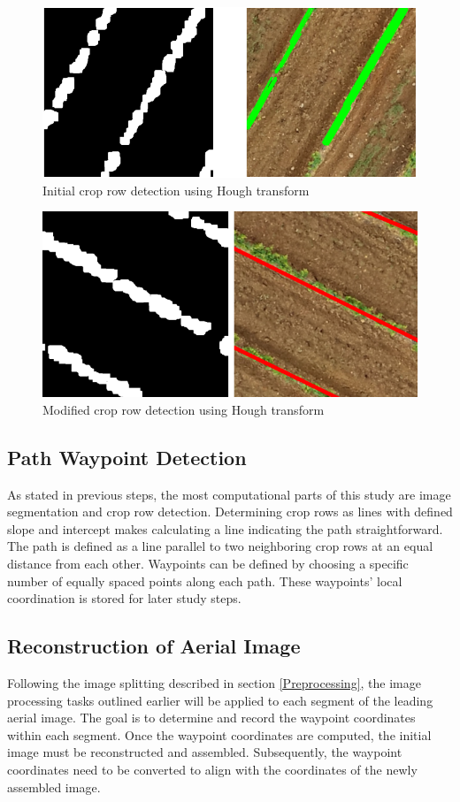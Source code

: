 \documentclass[conference]{IEEEtran}
\begin{document}
\begin{figure}[htbp]
\includegraphics[width=\linewidth]{Hough initial2.png}
\caption{Initial crop row detection using Hough transform
\cite{b5}}
\label{fig3}
\end{figure}

\begin{figure}[htbp]
\includegraphics[width=\linewidth]{Hough Revised2.png}
\caption{Modified crop row detection using Hough transform
\cite{b5}}
\label{fig4}
\end{figure}
\subsection{Path Waypoint Detection}\label{Path Waypoint Detection}
As stated in previous steps, the most computational parts of this study are image segmentation and crop row detection. Determining crop rows as lines with defined slope and intercept makes calculating a line indicating the path straightforward. The path is defined as a line parallel to two neighboring crop rows at an equal distance from each other.
Waypoints can be defined by choosing a specific number of equally spaced points along each path. These waypoints' local coordination is stored for later study steps.

\subsection{Reconstruction of Aerial Image}\label{Reconstruction of Aerial Image}
Following the image splitting described in section 
\ref{Preprocessing}, the image processing tasks outlined earlier will be applied to each segment of the leading aerial image. The goal is to determine and record the waypoint coordinates within each segment. Once the waypoint coordinates are computed, the initial image must be reconstructed and assembled. Subsequently, the waypoint coordinates need to be converted to align with the coordinates of the newly assembled image.
\end{document}
